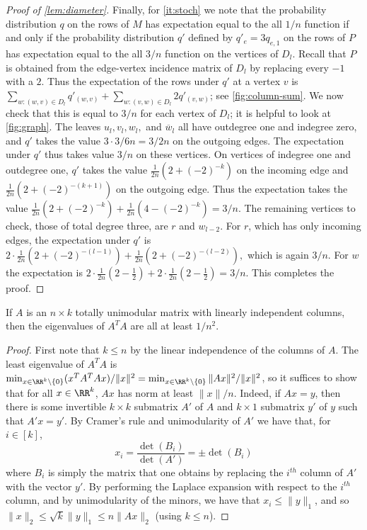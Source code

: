 \begin{proof}[Proof of \cref{lem:diameter}]
Finally, for \cref{it:stoch} we note that the probability distribution $q$ on the rows of $M$ has expectation equal to the all $1/n$ function if and only if the probability distribution $q'$ defined by $q'_e = 3q_{e, 1}$ on the rows of $P$ has expectation equal to the all $3/n$ function on the vertices of $D_l$. Recall that $P$ is obtained from the edge-vertex incidence matrix of $D_l$ by replacing every $-1$ with a $2$. Thus the expectation of the rows under $q'$ at a vertex $v$ is $\sum_{w: (w,v) \in D_l} q'_{(w,v)} + \sum_{w: (v,w) \in D_l} 2q'_{(v,w)}$; see \cref{fig:column-sum}. We now check that this is equal to $3/n$ for each vertex of $D_l$; it is helpful to look at \cref{fig:graph}. The leaves $u_l, v_l, w_l,$ and $\overline{w}_l$ all have outdegree one and indegree zero, and $q'$ takes the value $3 \cdot 3/6n = 3/2 n$ on the outgoing edges. The expectation under $q'$ thus takes value $3/n$ on these vertices. On vertices of indegree one and outdegree one, $q'$ takes the value $\frac{1}{2n} \left(2 + (-2)^{- k}\right)$ on the incoming edge and $\frac{1}{2n} \left(2 + (-2)^{- (k+1)}\right)$ on the outgoing edge. Thus the expectation takes the value $\frac{1}{2n} \left(2 + (-2)^{- k}\right) + \frac{1}{2n} \left(4 - (-2)^{- k}\right) = 3/n.$ The remaining vertices to check, those of total degree three, are $r$ and $w_{l-2}$. For $r$, which has only incoming edges, the expectation under $q'$ is $2\cdot \frac{1}{2n} \left(2 + (-2)^{- (l-1)}\right) + \frac{1}{2n} \left(2 + (-2)^{- (l-2)}\right),$ which is again $3/n$. For $w$ the expectation is $2\cdot \frac{1}{2n} \left(2 -\frac{1}{2}\right) + 2\cdot \frac{1}{2n} \left(2 -\frac{1}{2}\right) = 3/n.$ This completes the proof. \end{proof}



\begin{lem}\label{lem:unimod_sing}
If $A$ is an $n \times k$ totally unimodular matrix with linearly independent columns, then the eigenvalues of $A^T A$ are all at least $1/n^2$. 

\end{lem}

\begin{proof} First note that $k \leq n$ by the linear independence of the columns of $A$. The least eigenvalue of $A^T A$ is $\min_{x \in \RR^k\setminus \{0\}} (x^T A^T A x)/\|x\|^2 = \min_{x \in \RR^k\setminus \{0\}} \|Ax\|^2/\|x\|^2$, so it suffices to show that for all $x \in \RR^k$, $A x$ has norm at least $\|x\|/n$. Indeed, if $Ax = y$, then there is some invertible $k\times k$ submatrix $A'$ of $A$ and $k \times 1$ submatrix $y'$ of $y$ such that $A'x = y'$. By Cramer's rule and unimodularity of $A'$ we have that, for $i \in [k]$,
	$$ x_i = \dfrac{\det(B_i)}{\det(A')} = \pm \det(B_i)$$
	where $B_i$ is simply the matrix that one obtains by replacing the $i^{th}$ column of $A'$ with the
	vector $y'$. By performing the Laplace expansion with respect to the $i^{th}$ column, and by unimodularity of the
	minors, we have that $x_i \leq \|y\|_1$, and so $\|x\|_2 \leq \sqrt{k} \|y\|_1 \leq n \|Ax\|_2$ (using $k \leq n$).
\end{proof}



